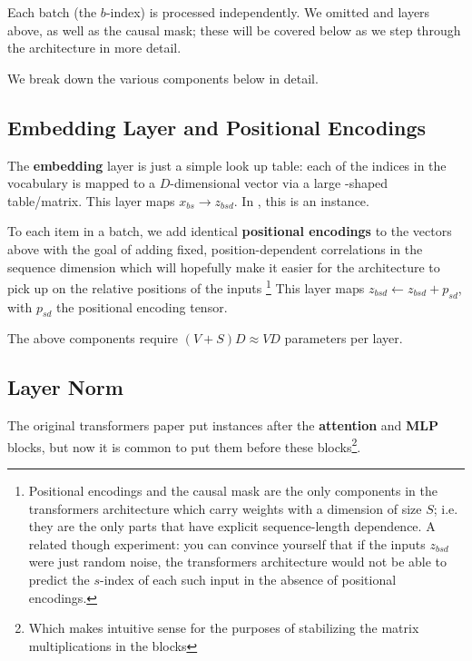 \documentclass[11pt]{article}
\begin{document}
Each batch (the $ b $-index) is processed independently. We omitted  and
 layers above, as well as the causal mask; these will be covered below as we step
through the architecture in more detail.


We break down the various components below in detail.

\subsection{Embedding Layer and Positional Encodings \label{subsubsec_embedding_and_pe} }

The \textbf{embedding} layer is just a simple look up table: each of the  indices
in the vocabulary is mapped to a $ D $-dimensional vector via a large -shaped
table/matrix. This layer maps $ x _{ bs } \longrightarrow z _{ bsd } $. In , this is
an  instance.

To each item in a batch, we add identical \textbf{positional encodings} to the vectors above with
the goal of adding fixed, position-dependent correlations in the sequence dimension which will
hopefully make it easier for the architecture to pick up on the relative positions of the inputs
\footnote{Positional encodings and the causal mask are the only components in the transformers
architecture which carry weights with a dimension of size $ S $; i.e. they are the only parts that
have explicit sequence-length dependence. A related though experiment: you can convince yourself
that if the inputs $ z_{ bsd } $
were just random noise, the transformers architecture would not be able to predict
the $ s $-index of each such input in the absence of positional encodings. } This layer maps $ z _{
bsd} \leftarrow z _{ bsd } + p _{ sd } $, with $ p _{ sd } $ the positional encoding tensor.

The above components require $ (V+S)D \approx VD $ parameters per layer.



\subsection{Layer Norm \label{subsubsec_layer_norm} }

The original transformers paper \cite{vaswani2017attention} put  instances after
the \textbf{attention} and \textbf{MLP} blocks, but now it is common \cite{xiong2020layer} to put
them before these blocks\footnote{Which makes intuitive sense for the purposes of stabilizing the
matrix multiplications in the blocks}.
\end{document}
